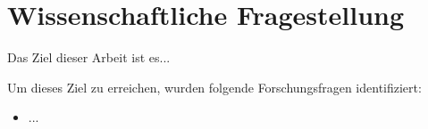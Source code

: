 \chapter{Wissenschaftliche Fragestellung}

Das Ziel dieser Arbeit ist es...
\bigskip

\noindent
Um dieses Ziel zu erreichen, wurden folgende Forschungsfragen identifiziert:

\begin{itemize}
	\item ...
\end{itemize}






%


%



